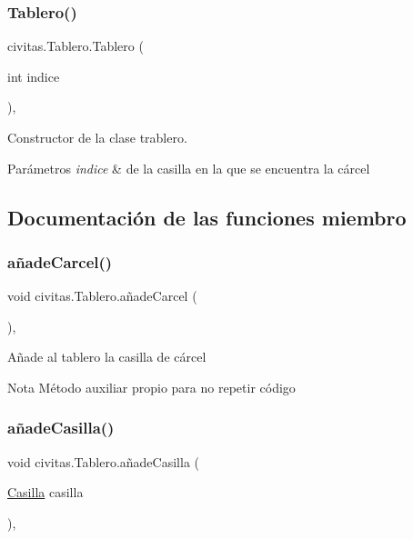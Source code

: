 \subsubsection{\texorpdfstring{Tablero()}{Tablero()}}
{\footnotesize\ttfamily civitas.\+Tablero.\+Tablero (\begin{DoxyParamCaption}\item[{int}]{indice }\end{DoxyParamCaption})\hspace{0.3cm}{\ttfamily [inline]}, {\ttfamily [package]}}



Constructor de la clase trablero. 


\begin{DoxyParams}{Parámetros}
{\em indice} & de la casilla en la que se encuentra la cárcel \\
\hline
\end{DoxyParams}


\subsection{Documentación de las funciones miembro}
\mbox{\label{classcivitas_1_1Tablero_a569f2c5e62ff14c894253af2cb359b62}} 
\subsubsection{\texorpdfstring{añade\+Carcel()}{añadeCarcel()}}
{\footnotesize\ttfamily void civitas.\+Tablero.\+añade\+Carcel (\begin{DoxyParamCaption}{ }\end{DoxyParamCaption})\hspace{0.3cm}{\ttfamily [inline]}, {\ttfamily [private]}}

Añade al tablero la casilla de cárcel \begin{DoxyNote}{Nota}
Método auxiliar propio para no repetir código 
\end{DoxyNote}
\mbox{\label{classcivitas_1_1Tablero_a31d74deef3494a34660c1f397c8c8c5c}} 
\subsubsection{\texorpdfstring{añade\+Casilla()}{añadeCasilla()}}
{\footnotesize\ttfamily void civitas.\+Tablero.\+añade\+Casilla (\begin{DoxyParamCaption}\item[{\hyperlink{classcivitas_1_1Casilla}{Casilla}}]{casilla }\end{DoxyParamCaption})\hspace{0.3cm}{\ttfamily [inline]}, {\ttfamily [package]}}

